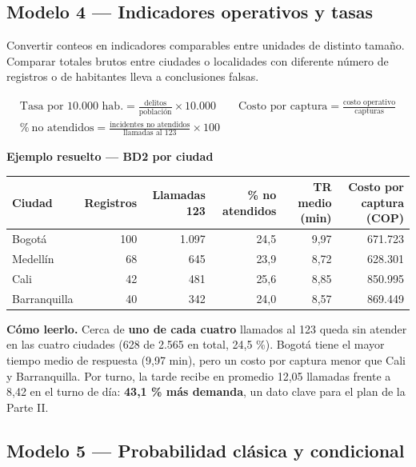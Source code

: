 \subsection{Modelo 4 --- Indicadores operativos y tasas}

\begin{cajaModelo}
Convertir conteos en indicadores comparables entre unidades de distinto tamaño. Comparar
totales brutos entre ciudades o localidades con diferente número de registros o de
habitantes lleva a conclusiones falsas.
\end{cajaModelo}

\begin{gather*}
\text{Tasa por 10.000 hab.}=\frac{\text{delitos}}{\text{población}}\times 10.000
\qquad
\text{Costo por captura}=\frac{\text{costo operativo}}{\text{capturas}}\\[4pt]
\%\ \text{no atendidos}=\frac{\text{incidentes no atendidos}}{\text{llamadas al 123}}\times 100
\end{gather*}

\textbf{Ejemplo resuelto --- BD2 por ciudad}

\begin{center}
\small
\begin{tabular}{@{}lrrrrr@{}}
\toprule
Ciudad & Registros & Llamadas 123 & \% no atendidos & TR medio (min) & Costo por captura (COP)\\
\midrule
Bogotá & 100 & 1.097 & 24,5 & 9,97 & 671.723\\
Medellín & 68 & 645 & 23,9 & 8,72 & 628.301\\
Cali & 42 & 481 & 25,6 & 8,85 & 850.995\\
Barranquilla & 40 & 342 & 24,0 & 8,57 & 869.449\\
\bottomrule
\end{tabular}
\end{center}

\textbf{Cómo leerlo.} Cerca de \textbf{uno de cada cuatro} llamados al 123 queda sin
atender en las cuatro ciudades (628 de 2.565 en total, 24,5 \%). Bogotá tiene el mayor
tiempo medio de respuesta (9,97 min), pero un costo por captura menor que Cali y
Barranquilla. Por turno, la tarde recibe en promedio 12,05 llamadas frente a 8,42 en el
turno de día: \textbf{43,1 \% más demanda}, un dato clave para el plan de la Parte II.

\subsection{Modelo 5 --- Probabilidad clásica y condicional}

